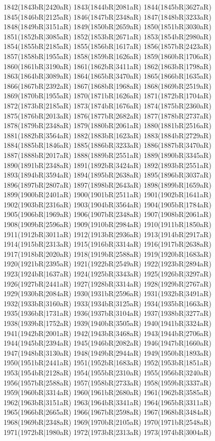 1842(1843bR|2420aR) 1843(1844bR|2081aR) 1844(1845bR|3627aR) \\1845(1846bR|2125aR) 1846(1847bR|2348aR) 1847(1848bR|3233aR) 1848(1849bR|3151aR) 1849(1850bR|2659aR) 1850(1851bR|3030aR) 1851(1852bR|3085aR) 1852(1853bR|2671aR) 1853(1854bR|2980aR) \\1854(1855bR|2185aR) 1855(1856bR|1617aR) 1856(1857bR|2423aR) 1857(1858bR|1955aR) 1858(1859bR|1626aR) 1859(1860bR|1706aR) 1860(1861bR|3190aR) 1861(1862bR|3411aR) 1862(1863bR|1798aR) \\1863(1864bR|3089aR) 1864(1865bR|3470aR) 1865(1866bR|1635aR) 1866(1867bR|2392aR) 1867(1868bR|1968aR) 1868(1869bR|2519aR) 1869(1870bR|1955aR) 1870(1871bR|1626aR) 1871(1872bR|1704aR) \\1872(1873bR|2185aR) 1873(1874bR|1676aR) 1874(1875bR|2360aR) 1875(1876bR|2013aR) 1876(1877bR|2682aR) 1877(1878bR|2737aR) 1878(1879bR|2348aR) 1879(1880bR|2061aR) 1880(1881bR|2516aR) \\1881(1882bR|3564aR) 1882(1883bR|1623aR) 1883(1884bR|2729aR) 1884(1885bR|1846aR) 1885(1886bR|3233aR) 1886(1887bR|3470aR) 1887(1888bR|2017aR) 1888(1889bR|2551aR) 1889(1890bR|3345aR) \\1890(1891bR|2348aR) 1891(1892bR|3424aR) 1892(1893bR|2551aR) 1893(1894bR|3594aR) 1894(1895bR|2638aR) 1895(1896bR|3037aR) 1896(1897bR|2807aR) 1897(1898bR|2643aR) 1898(1899bR|1659aR) \\1899(1900bR|2401aR) 1900(1901bR|2511aR) 1901(1902bR|1641aR) 1902(1903bR|2316aR) 1903(1904bR|3564aR) 1904(1905bR|1784aR) 1905(1906bR|1969aR) 1906(1907bR|2348aR) 1907(1908bR|2061aR) \\1908(1909bR|2596aR) 1909(1910bR|2984aR) 1910(1911bR|1850aR) 1911(1912bR|3011aR) 1912(1913bR|2936aR) 1913(1914bR|2917aR) 1914(1915bR|2313aR) 1915(1916bR|3314aR) 1916(1917bR|2638aR) \\1917(1918bR|2020aR) 1918(1919bR|2588aR) 1919(1920bR|1683aR) 1920(1921bR|2395aR) 1921(1922bR|2549aR) 1922(1923bR|2894aR) 1923(1924bR|1637aR) 1924(1925bR|3343aR) 1925(1926bR|3297aR) \\1926(1927bR|2441aR) 1927(1928bR|3314aR) 1928(1929bR|2767aR) 1929(1930bR|2084aR) 1930(1931bR|2596aR) 1931(1932bR|3491aR) 1932(1933bR|3160aR) 1933(1934bR|3125aR) 1934(1935bR|1663aR) \\1935(1936bR|1731aR) 1936(1937bR|3104aR) 1937(1938bR|3277aR) 1938(1939bR|1752aR) 1939(1940bR|3505aR) 1940(1941bR|3324aR) 1941(1942bR|2001aR) 1942(1943bR|3468aR) 1943(1944bR|2706aR) \\1944(1945bR|2394aR) 1945(1946bR|2082aR) 1946(1947bR|1660aR) 1947(1948bR|3130aR) 1948(1949bR|2944aR) 1949(1950bR|1893aR) 1950(1951bR|2441aR) 1951(1952bR|1683aR) 1952(1953bR|1851aR) \\1953(1954bR|2128aR) 1954(1955bR|2310aR) 1955(1956bR|3240aR) 1956(1957bR|2588aR) 1957(1958bR|2733aR) 1958(1959bR|3337aR) 1959(1960bR|3314aR) 1960(1961bR|2680aR) 1961(1962bR|3585aR) \\1962(1963bR|3151aR) 1963(1964bR|3341aR) 1964(1965bR|3311aR) 1965(1966bR|2665aR) 1966(1967bR|2598aR) 1967(1968bR|3484aR) 1968(1969bR|2348aR) 1969(1970bR|2105aR) 1970(1971bR|2548aR) \\1971(1972bR|1980aR) 1972(1973bR|2313aR) 1973(1974bR|3004aR) 